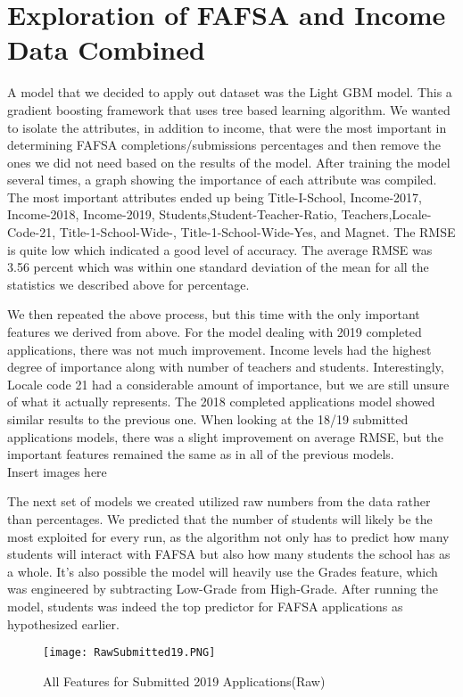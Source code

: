 \documentclass[12pt]{article}
\begin{document}
\section{Exploration of FAFSA and Income Data Combined}
A model that we decided to apply out dataset was the Light GBM model. This a gradient boosting framework that uses tree based learning algorithm. We wanted to isolate the attributes, in addition to income, that were the most important in determining FAFSA completions/submissions percentages and then remove the ones we did not need based on the results of the model. After training the model several times, a graph showing the importance of each attribute was compiled. The most important attributes ended up being Title-I-School, Income-2017, Income-2018, Income-2019, Students,Student-Teacher-Ratio, Teachers,Locale-Code-21, Title-1-School-Wide-, Title-1-School-Wide-Yes, and Magnet. The RMSE is quite low which indicated a good level of accuracy. The average RMSE was 3.56 percent which was within one standard deviation of the mean for all the statistics we described above for percentage.

We then repeated the above process, but this time with the only important features we derived from above. For the model dealing with 2019 completed applications, there was not much improvement. Income levels had the highest degree of importance along with number of teachers and students. Interestingly, Locale code 21 had a considerable amount of importance, but we are still unsure of what it actually represents. The 2018 completed applications model showed similar results to the previous one. When looking at the 18/19 submitted applications models, there was a slight improvement on average RMSE, but the important features remained the same as in all of the previous models.\\


Insert images here

The next set of models we created utilized raw numbers from the data rather than percentages. We predicted that the number of students will likely be the most exploited for every run, as the algorithm not only has to predict how many students will interact with FAFSA but also how many students the school has as a whole. It's also possible the model will heavily use the Grades feature, which was engineered by subtracting Low-Grade from High-Grade. After running the model, students was indeed the top predictor for FAFSA applications as hypothesized earlier.

\begin{figure}[!htb]
  \centering
  \texttt{[image: RawSubmitted19.PNG]}
  \caption{All Features for Submitted 2019 Applications(Raw)}
  \label{fig:feature_importance}
\end{figure}
\end{document}
